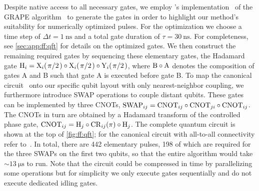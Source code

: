 Despite native access to all necessary gates, we employ \qutip's implementation~\cite{Johansson2012} of the GRAPE algorithm~\cite{Khaneja2005,Schulte-Herbruggen2005} to generate the gates in order to highlight our method's suitability for numerically optimized pulses.
For the optimization we choose a time step of $\Delta t = \qty{1}{\nano\second}$ and a total gate duration of $\tau = \qty{30}{\nano\second}$.
For completeness, see \cref{sec:app:ff:qft} for details on the optimized gates.
We then construct the remaining required gates by sequencing these elementary gates, \ie the Hadamard gate $\mr{H}_i = \mr{X}_{i}(\flatfrac{\pi}{2})\circ\mr{X}_{i}(\flatfrac{\pi}{2})\circ\mr{Y}_{i}(\flatfrac{\pi}{2})$, where $\mathrm{B}\circ\mathrm{A}$ denotes the composition of gates A and B such that gate A is executed before gate B.
To map the canonical circuit~\cite{Nielsen2011} onto our specific qubit layout with only nearest-neighbor coupling, we furthermore introduce SWAP operations to couple distant qubits.
These gates can be implemented by three CNOTs, $\mathrm{SWAP}_{ij} = \mathrm{CNOT}_{ij}\circ\mathrm{CNOT}_{ji}\circ\mathrm{CNOT}_{ij}$.
The CNOTs in turn are obtained by a Hadamard transform of the controlled phase gate, $\mathrm{CNOT}_{ij} = \mathrm{H}_j\circ\mathrm{CR}_{ij}(\pi)\circ\mathrm{H}_j$.
The complete quantum circuit is shown at the top of \cref{fig:ff:qft}; for the canonical circuit with all-to-all connectivity refer to~.
In total, there are \num{442} elementary pulses, \num{198} of which are required for the three SWAPs on the first two qubits, so that the entire algorithm would take $\sim\qty{13}{\micro\second}$ to run.
Note that the circuit could be compressed in time by parallelizing some operations but for simplicity we only execute gates sequentially and do not execute dedicated idling gates.

